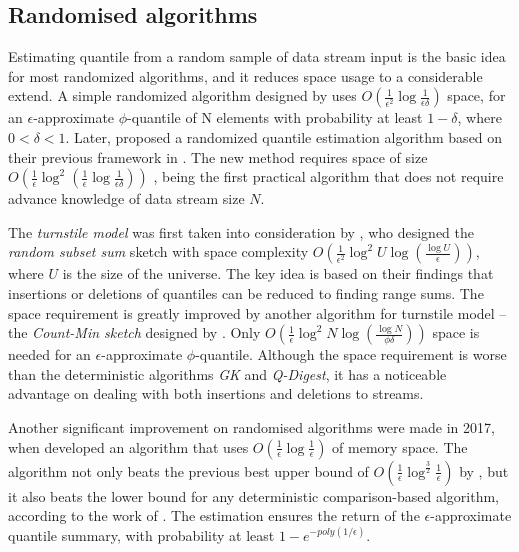 \subsection{Randomised algorithms}
\label{randomised}

Estimating quantile from a random sample of data stream input is the basic idea for most randomized algorithms, and it reduces space usage to a considerable extend.
A simple randomized algorithm designed by \citeauthor{floydExpectedTimeBounds1975}\cite{floydExpectedTimeBounds1975} uses $O(\frac{1}{\epsilon^2} \log \frac{1}{\epsilon \delta})$ space, for an $\epsilon$-approximate $\phi$-quantile of N elements with probability at least $1 - \delta$, where $0 < \delta < 1$.
Later, \citeauthor{mankuRandomSamplingTechniques}\cite{mankuRandomSamplingTechniques} proposed a randomized quantile estimation algorithm based on their previous framework in \cite{mankuApproximateMediansOthera}. The new method requires space of size 
$O(
    \frac{1}{\epsilon} \log^2 
    (\frac{1}{\epsilon} 
        \log \frac{1}{\epsilon \delta}
    )
)
$
, being the first practical algorithm that does not require advance knowledge of data stream size $N$.

The \textit{turnstile model} was first taken into consideration by \citeauthor{gilbertChapter40How2002}\cite{gilbertChapter40How2002}, who designed the \textit{random subset sum} sketch with space complexity 
$O(\frac{1}{\epsilon^2} \log^2 U \log (\frac{\log U}{\epsilon}))$, where $U$ is the size of the universe. 
The key idea is based on their findings that insertions or deletions of quantiles can be reduced to finding range sums.
The space requirement is greatly improved by another algorithm for turnstile model -- the \textit{Count-Min sketch} designed by \citeauthor{cormodeImprovedDataStream2005}\cite{cormodeImprovedDataStream2005}. Only 
$O(\frac{1}{\epsilon} \log^2 N \log (\frac{\log N}{\phi \delta}))$ space is needed for an $\epsilon$-approximate $\phi$-quantile. Although the space requirement is worse than the deterministic algorithms \textit{GK} and \textit{Q-Digest}, it has a noticeable advantage on dealing with both insertions and deletions to streams.

Another significant improvement on randomised algorithms were made in 2017, when \citeauthor{felberRandomizedOnlineQuantile2017}\cite{felberRandomizedOnlineQuantile2017} developed an algorithm that uses $O(\frac{1}{\epsilon}\log \frac{1}{\epsilon})$ of memory space. The algorithm not only beats the previous best upper bound of $O(\frac{1}{\epsilon}\log^{\frac{3}{2}}\frac{1}{\epsilon})$ by \citeauthor{agarwalMergeableSummaries}\cite{agarwalMergeableSummaries}, but it also beats the lower bound for any deterministic comparison-based algorithm, according to the work of \citeauthor{hungBoundFindingEApproximate}\cite{hungBoundFindingEApproximate}. The estimation ensures the return of the $\epsilon$-approximate quantile summary, with probability at least $1-e^{-poly(1/\epsilon)}$.


